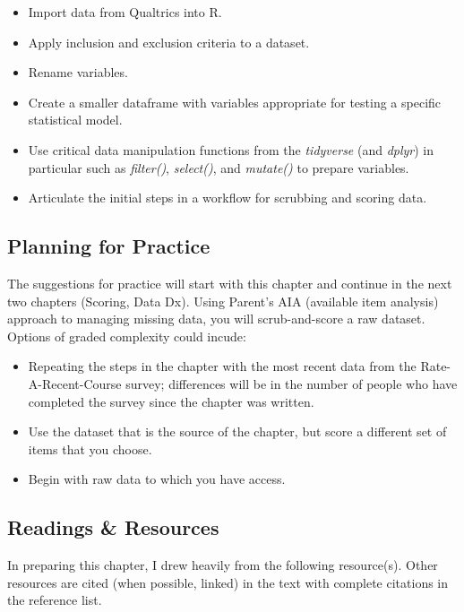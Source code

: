\documentclass[
  11pt,
]{book}
\providecommand{\tightlist}{%
  \setlength{\itemsep}{0pt}\setlength{\parskip}{0pt}}
\begin{document}
\begin{itemize}
\tightlist
\item
  Import data from Qualtrics into R.
\item
  Apply inclusion and exclusion criteria to a dataset.
\item
  Rename variables.
\item
  Create a smaller dataframe with variables appropriate for testing a specific statistical model.
\item
  Use critical data manipulation functions from the \emph{tidyverse} (and \emph{dplyr}) in particular such as \emph{filter()}, \emph{select()}, and \emph{mutate()} to prepare variables.
\item
  Articulate the initial steps in a workflow for scrubbing and scoring data.
\end{itemize}

\hypertarget{planning-for-practice}{%
\subsection{Planning for Practice}\label{planning-for-practice}}

The suggestions for practice will start with this chapter and continue in the next two chapters (Scoring, Data Dx). Using Parent's \citeyearpar{parent_handling_2013} AIA (available item analysis) approach to managing missing data, you will scrub-and-score a raw dataset. Options of graded complexity could incude:

\begin{itemize}
\tightlist
\item
  Repeating the steps in the chapter with the most recent data from the Rate-A-Recent-Course survey; differences will be in the number of people who have completed the survey since the chapter was written.
\item
  Use the dataset that is the source of the chapter, but score a different set of items that you choose.
\item
  Begin with raw data to which you have access.
\end{itemize}

\hypertarget{readings-resources}{%
\subsection{Readings \& Resources}\label{readings-resources}}

In preparing this chapter, I drew heavily from the following resource(s). Other resources are cited (when possible, linked) in the text with complete citations in the reference list.
\end{document}
